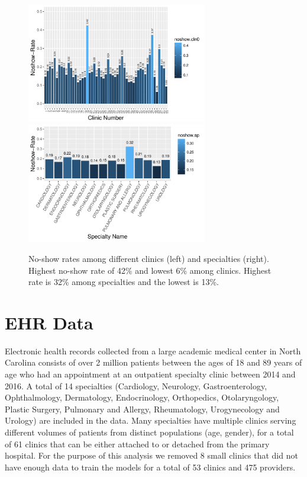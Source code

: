 \documentclass[twoside,11pt]{article}
\begin{document}
\begin{figure}[t]
\begin{center}
\includegraphics[width=0.7\textwidth,keepaspectratio]{fig2/eda-ns-cl-new}\\
\includegraphics[width=0.7\textwidth,keepaspectratio]{fig2/eda-ns-sp}
\caption{No-show rates among different clinics (left) and specialties (right). Highest no-show rate of 42\% and lowest 6\% among clinics. Highest rate is 32\% among specialties and the lowest is 13\%. } \label{fig:Fig1}
\end{center}
\vspace{-0.8cm}
\end{figure} 

 
\section{EHR Data}

Electronic health records collected from a large academic medical center in North Carolina consists of over 2 million patients between the ages of 18 and 89 years of age who had an appointment at an outpatient specialty clinic between 2014 and 2016. A total of 14 specialties (Cardiology, Neurology, Gastroenterology, Ophthalmology, Dermatology, Endocrinology, Orthopedics, Otolaryngology, Plastic Surgery, Pulmonary and Allergy, Rheumatology, Urogynecology and Urology) are included in the data. Many specialties have multiple clinics serving different volumes of patients from distinct populations (age, gender), for a total of 61 clinics that can be either attached to or detached from the primary hospital. For the purpose of this analysis we removed 8 small clinics that did not have enough data to train the models for a total of 53 clinics and 475 providers. 
\end{document}
